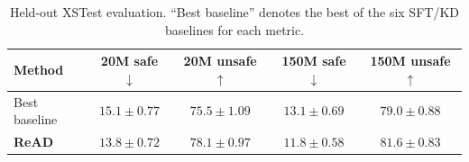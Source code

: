 \begin{table}[h]
  \centering
  \caption{
  Held-out XSTest evaluation. ``Best baseline'' denotes the best of the six
  SFT/KD baselines for each metric.
  }
  \label{tab:xstest}
  \scriptsize
  \setlength{\tabcolsep}{4pt}
  \renewcommand{\arraystretch}{0.95}
  \begin{tabular}{@{}lcccc@{}}
    \toprule
    \textbf{Method}
      & \textbf{20M safe $\downarrow$}
      & \textbf{20M unsafe $\uparrow$}
      & \textbf{150M safe $\downarrow$}
      & \textbf{150M unsafe $\uparrow$} \\
    \midrule
    Best baseline
      & $15.1\pm0.77$
      & $75.5\pm1.09$
      & $13.1\pm0.69$
      & $79.0\pm0.88$ \\
    \textbf{ReAD}
      & $\mathbf{13.8\pm0.72}$
      & $\mathbf{78.1\pm0.97}$
      & $\mathbf{11.8\pm0.58}$
      & $\mathbf{81.6\pm0.83}$ \\
    \bottomrule
  \end{tabular}
\end{table}
